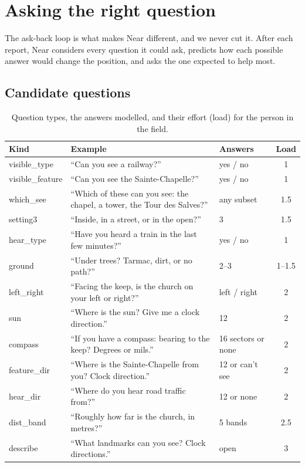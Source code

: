 \chapter{Asking the right question}\label{ch:questions}

The ask-back loop is what makes Near different, and we never cut it. After each report, Near considers
every question it could ask, predicts how each possible answer would change the position, and asks the one
expected to help most.

\section{Candidate questions}

\begin{table}[htbp]\centering\small
\caption{Question types, the answers modelled, and their effort (load) for the person in the field.}\label{tab:qtypes}
\begin{tabularx}{\linewidth}{lXlc}
\toprule
Kind & Example & Answers & Load\\
\midrule
visible\_type & ``Can you see a railway?'' & yes / no & 1\\
visible\_feature & ``Can you see the Sainte-Chapelle?'' & yes / no & 1\\
which\_see & ``Which of these can you see: the chapel, a tower, the Tour des Salves?'' & any subset & 1.5\\
setting3 & ``Inside, in a street, or in the open?'' & 3 & 1.5\\
hear\_type & ``Have you heard a train in the last few minutes?'' & yes / no & 1\\
ground & ``Under trees? Tarmac, dirt, or no path?'' & 2--3 & 1--1.5\\
left\_right & ``Facing the keep, is the church on your left or right?'' & left / right & 2\\
sun & ``Where is the sun? Give me a clock direction.'' & 12 & 2\\
compass & ``If you have a compass: bearing to the keep? Degrees or mils.'' & 16 sectors or none & 2\\
feature\_dir & ``Where is the Sainte-Chapelle from you? Clock direction.'' & 12 or can't see & 2\\
hear\_dir & ``Where do you hear road traffic from?'' & 12 or none & 2\\
dist\_band & ``Roughly how far is the church, in metres?'' & 5 bands & 2.5\\
describe & ``What landmarks can you see? Clock directions.'' & open & 3\\
\bottomrule
\end{tabularx}
\end{table}

